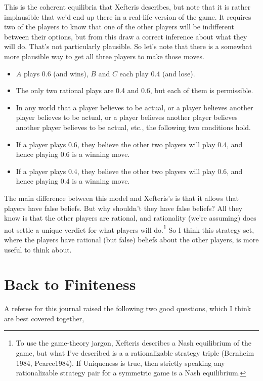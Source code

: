 \documentclass[12pt,]{article}
\providecommand{\tightlist}{%
  \setlength{\itemsep}{0pt}\setlength{\parskip}{0pt}}
\let\rmarkdownfootnote\footnote%
\def\footnote{\protect\rmarkdownfootnote}
\begin{document}
This is the coherent equilibria that Xefteris describes, but note that it is rather implausible that we'd end up there in a real-life version of the game. It requires two of the players to know that one of the other players will be indifferent between their options, but from this draw a correct inference about what they will do. That's not particularly plausible. So let's note that there is a somewhat more plausible way to get all three players to make those moves.

\begin{itemize}
\tightlist
\item
  \(A\) plays 0.6 (and wins), \(B\) and \(C\) each play 0.4 (and lose).
\item
  The only two rational plays are 0.4 and 0.6, but each of them is permissible.
\item
  In any world that a player believes to be actual, or a player believes another player believes to be actual, or a player believes another player believes another player believes to be actual, etc., the following two conditions hold.
\item
  If a player plays 0.6, they believe the other two players will play 0.4, and hence playing 0.6 is a winning move.
\item
  If a player plays 0.4, they believe the other two players will play 0.6, and hence playing 0.4 is a winning move.
\end{itemize}

The main difference between this model and Xefteris's is that it allows that players have false beliefs. But why shouldn't they have false beliefs? All they know is that the other players are rational, and rationality (we're assuming) does not settle a unique verdict for what players will do.\footnote{To use the game-theory jargon, Xefteris describes a Nash equilibrium of the game, but what I've described is a a rationalizable strategy triple (Bernheim 1984, Pearce1984). If Uniqueness is true, then strictly speaking any rationalizable strategy pair for a symmetric game is a Nash equilibrium.} So I think this strategy set, where the players have rational (but false) beliefs about the other players, is more useful to think about.

\hypertarget{back-to-finiteness}{%
\section{Back to Finiteness}\label{back-to-finiteness}}

A referee for this journal raised the following two good questions, which I think are best covered together,
\end{document}
